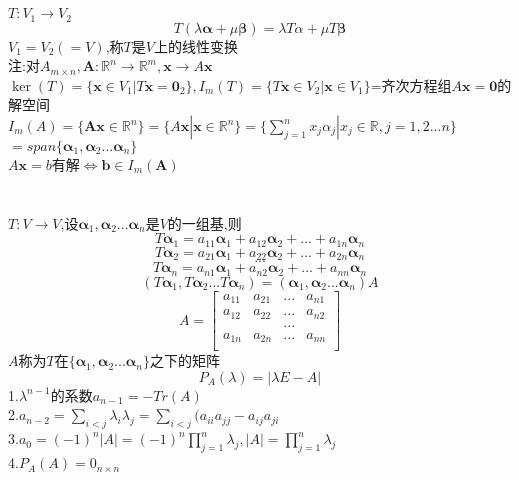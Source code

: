 \documentclass[11pt, a4paper, UTF8]{ctexart}
\begin{document}
\section{}
$T:V_1\to V_2$
\[T(\lambda\bm\alpha+\mu\bm\beta)=\lambda T\alpha+\mu T\bm\beta\]
$V_1=V_2(=V)$,称$T$是$V$上的线性变换\\
注:对$A_{m\times n},\bm A:\mathbb{R}^n\to\mathbb{R}^m,\bm x\to A\bm x$\\
$\ker(T)=\{\bm x\in V_1|T\bm x=\bm0_2\},I_m(T)=\{T\bm x\in V_2|\bm x\in V_1\}$=齐次方程组$A\bm x=\bm0$的解空间\\
$I_m(A)=\{\bm A\bm x\in\mathbb{R}^n\}=\{A\bm x|\bm x\in\mathbb{R}^n\}=\{\sum_{j=1}^nx_j\alpha_j|x_j\in\mathbb{R},j=1,2...n\}$\\$
=span\{\bm\alpha_1,\bm\alpha_2...\bm\alpha_n\}$\\
$A\bm x=b$有解$\Leftrightarrow\bm b\in I_m(\bm A)$
\section{}
$T:V\to V$,设$\bm\alpha_1,\bm\alpha_2...\bm\alpha_n$是$V$的一组基,则
\[T\bm\alpha_1=a_{11}\bm\alpha_1+a_{12}\bm\alpha_2+...+a_{1n}\bm\alpha_n\]
\[T\bm\alpha_2=a_{21}\bm\alpha_1+a_{22}\bm\alpha_2+...+a_{2n}\bm\alpha_n\]
\[...\]
\[T\bm\alpha_n=a_{n1}\bm\alpha_1+a_{n2}\bm\alpha_2+...+a_{nn}\bm\alpha_n\]
\[(T\bm\alpha_1,T\bm\alpha_2...T\bm\alpha_n)=(\bm\alpha_1,\bm\alpha_2...\bm\alpha_n)A\]
\[A=\begin{bmatrix}
a_{11}&a_{21}&...&a_{n1}\\
a_{12}&a_{22}&...&a_{n2}\\
&&...&\\
a_{1n}&a_{2n}&...&a_{nn}\\
\end{bmatrix}\]
$A$称为$T$在$\{\bm\alpha_1,\bm\alpha_2...\bm\alpha_n\}$之下的矩阵\\
\[P_A(\lambda)=|\lambda E-A|\]
1.$\lambda^{n-1}$的系数$a_{n-1}=-Tr(A)$\\
2.$a_{n-2}=\sum_{i<j}\lambda_i\lambda_j=\sum_{i<j}(a_{ii}a_{jj}-a_{ij}a_{ji}$\\
3.$a_0=(-1)^n|A|=(-1)^n\prod_{j=1}^n\lambda_j,|A|=\prod_{j=1}^n\lambda_j$\\
4.$P_A(A)=0_{n\times n}$\\
\end{document}
